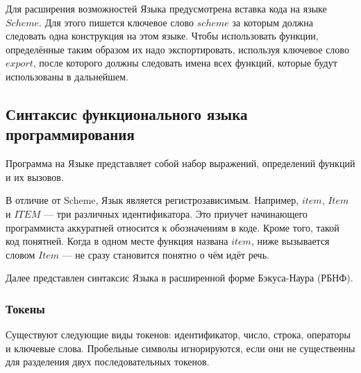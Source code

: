         

        Для расширения возможностей Языка предусмотрена вставка кода на языке $Scheme$.
        Для этого пишется ключевое слово $scheme$ за которым должна следовать одна конструкция на этом языке.
        Чтобы использовать функции, определённые таким образом их надо экспортировать, используя ключевое слово $export$, после которого должны следовать имена всех функций, которые будут использованы в дальнейшем.

    \subsection{Синтаксис функционального языка программирования}
        Программа на Языке представляет собой набор выражений, определений функций и их вызовов.
        
        В отличие от Scheme, Язык является регистрозависимым.
        Например, $item$, $Item$ и $ITEM$ --- три различных идентификатора.
        Это приучет начинающего программиста аккуратней относится к обозначениям в коде.
        Кроме того, такой код понятней.
        Когда в одном месте функция названа $item$, ниже вызывается словом $Item$ --- не сразу становится понятно о чём идёт речь.

        Далее представлен синтаксис Языка в расширенной форме Бэкуса-Наура (РБНФ)\cite{skor}.

        \subsubsection{Токены}
            Существуют следующие виды токенов: идентификатор, число, строка, операторы и ключевые слова.
            Пробельные символы игнорируются, если они не существенны для разделения двух последовательных токенов.

